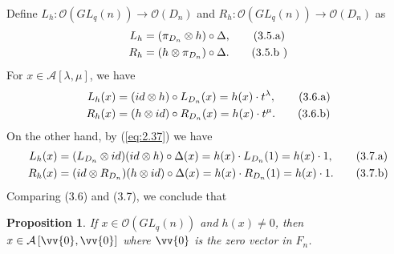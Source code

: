 \documentclass[table,a4paper,reqno]{amsart}
\numberwithin{equation}{section}
\newtheorem{proposition}[theorem]{Proposition}
\theoremstyle{definition}
\begin{document}
Define $L_h:\mathcal{O}(GL_q(n))\rightarrow\mathcal{O}(D_n)$ and $R_h:\mathcal{O}(GL_q(n))\rightarrow\mathcal{O}(D_n)$ as
\begin{align}\addtocounter{equation}{1}
    L_h&=(\pi_{D_n}\otimes h)\circ\Delta,\tag{3.5.a}\label{eq:3.3.a}\\
    R_h&=(h\otimes \pi_{D_n})\circ\Delta.\tag{3.5.b }\label{eq:3.3.b}
\end{align}
For $x\in \mathcal{A}[\lambda,\mu]$, we have
\begin{align}\addtocounter{equation}{1}
    L_h(x)&=(id\otimes h)\circ L_{D_n}(x)=h(x)\cdot t^{\lambda},\tag{3.6.a}\label{eq:3.4.a}\\
    R_h(x)&=(h \otimes id)\circ R_{D_n}(x)=h(x)\cdot t^{\mu}.\tag{3.6.b}\label{eq:3.4.b}
\end{align}
On the other hand, by (\ref{eq:2.37}) we have
\begin{align}\addtocounter{equation}{1}
    L_h(x)&=(L_{D_n}\otimes id)(id\otimes h)\circ\Delta(x)=h(x)\cdot L_{D_n}(1)=h(x)\cdot 1,\tag{3.7.a}\label{eq:3.5.a}\\
    R_h(x)&=(id\otimes R_{D_n})(h\otimes id)\circ\Delta(x)=h(x)\cdot R_{D_n}(1)=h(x)\cdot 1.\tag{3.7.b}\label{eq:3.5.b}
\end{align}
Comparing (3.6) and (3.7), we conclude that
\begin{proposition}\label{prop:3.3}
    If $x\in\mathcal{O}(GL_q(n))$ and $h(x)\ne 0$, then $x\in \mathcal{A}\left[\vv{0},\vv{0}\right]$ where $\vv{0}$ is the zero vector in $F_n$.
\end{proposition}
\end{document}

